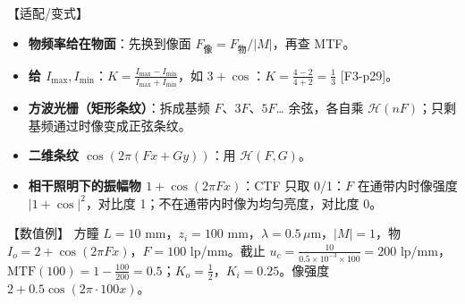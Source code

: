 \begin{exam}{【适配/变式】}
\begin{itemize}
\item \textbf{物频率给在物面}：先换到像面 $F_{\text{像}}=F_{\text{物}}/|M|$，再查 MTF。
\item \textbf{给 $I_{\max},I_{\min}$}：$K=\frac{I_{\max}-I_{\min}}{I_{\max}+I_{\min}}$，如 $3+\cos$：$K=\frac{4-2}{4+2}=\frac13$ [F3-p29]。
\item \textbf{方波光栅（矩形条纹）}：拆成基频 $F$、$3F$、$5F$… 余弦，各自乘 $\mathcal H(nF)$；只剩基频通过时像变成正弦条纹。
\item \textbf{二维条纹 $\cos(2\pi(Fx+Gy))$}：用 $\mathcal H(F,G)$。
\item \textbf{相干照明下的振幅物 $1+\cos(2\pi Fx)$}：CTF 只取 0/1：$F$ 在通带内时像强度 $|1+\cos|^2$，对比度 1；不在通带内时像为均匀亮度，对比度 0。
\end{itemize}
\end{exam}

\begin{exam}{【数值例】}
方瞳 $L=10$ mm，$z_i=100$ mm，$\lambda=0.5\,\mu$m，$|M|=1$，物 $I_o=2+\cos(2\pi Fx)$，$F=100$ lp/mm。截止 $u_c=\frac{10}{0.5\times10^{-3}\times100}=200$ lp/mm，$\mathrm{MTF}(100)=1-\frac{100}{200}=0.5$；$K_o=\frac12$，$K_i=0.25$。像强度 $2+0.5\cos(2\pi\cdot100x)$。
\end{exam}

